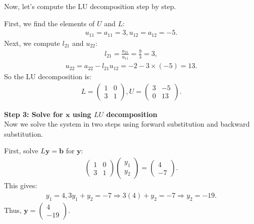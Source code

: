\documentclass[journal]{IEEEtran}
\begin{document}
Now, let's compute the LU decomposition step by step.  

First, we find the elements of $U$ and $L$:  
\begin{align}  
u_{11} = a_{11} = 3, u_{12} = a_{12} = -5.  
\end{align}  
Next, we compute $l_{21}$ and $u_{22}$:  
\begin{align}  
l_{21} = \frac{a_{21}}{u_{11}} = \frac{9}{3} = 3,  
\end{align}  
\begin{align}  
u_{22} = a_{22} - l_{21} u_{12} = -2 - 3 \times (-5) = 13.  
\end{align}  
So the LU decomposition is:  
\begin{align}  
L = \begin{pmatrix} 1 & 0 \\ 3 & 1 \end{pmatrix}, U = \begin{pmatrix} 3 & -5 \\ 0 & 13 \end{pmatrix}.  
\end{align}

\textbf{Step 3: Solve for $\mathbf{x}$ using $LU$ decomposition}  \\
Now we solve the system in two steps using forward substitution and backward substitution.  

First, solve $L \mathbf{y} = \mathbf{b}$ for $\mathbf{y}$:  
\begin{align}  
\begin{pmatrix} 1 & 0 \\ 3 & 1 \end{pmatrix} \begin{pmatrix} y_1 \\ y_2 \end{pmatrix} = \begin{pmatrix} 4 \\ -7 \end{pmatrix}.  
\end{align}  
This gives:  
\begin{align}  
y_1 = 4, 3y_1 + y_2 = -7 \Rightarrow 3(4) + y_2 = -7 \Rightarrow y_2 = -19.  
\end{align}  
Thus, $\mathbf{y} = \begin{pmatrix} 4 \\ -19 \end{pmatrix}$.  
\end{document}
